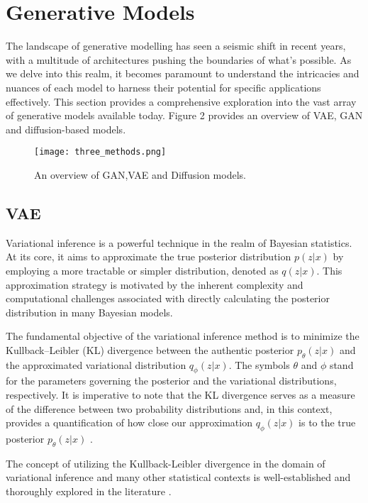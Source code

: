 \documentclass[preprint,12pt,authoryear]{elsarticle}
\begin{document}
\section{Generative Models}

The landscape of generative modelling has seen a seismic shift in recent years, with a multitude of architectures pushing the boundaries of what's possible. As we delve into this realm, it becomes paramount to understand the intricacies and nuances of each model to harness their potential for specific applications effectively. This section provides a comprehensive exploration into the vast array of generative models available today. Figure 2 provides an overview of VAE, GAN and diffusion-based models. %

\begin{figure}
    \centering
    \centerline{\texttt{[image: three\_methods.png]}}
    \caption{An overview of GAN,VAE and Diffusion models.}
    \label{Fig 2}
\end{figure}

\subsection{VAE}
Variational inference is a powerful technique in the realm of Bayesian statistics. At its core, it aims to approximate the true posterior distribution \(p(z|x)\) by employing a more tractable or simpler distribution, denoted as \(q(z|x)\). This approximation strategy is motivated by the inherent complexity and computational challenges associated with directly calculating the posterior distribution in many Bayesian models.

The fundamental objective of the variational inference method is to minimize the Kullback--Leibler (KL) divergence between the authentic posterior \(p_\theta(z|x)\) and the approximated variational distribution \(q_\phi(z|x)\). The symbols \(\theta\) and \(\phi\) stand for the parameters governing the posterior and the variational distributions, respectively. It is imperative to note that the KL divergence serves as a measure of the difference between two probability distributions and, in this context, provides a quantification of how close our approximation \(q_\phi(z|x)\) is to the true posterior \(p_\theta(z|x)\) \cite{75_KL}.

The concept of utilizing the Kullback-Leibler divergence in the domain of variational inference and many other statistical contexts is well-established and thoroughly explored in the literature \cite{74}. 
\end{document}
